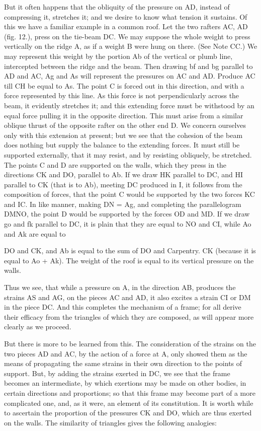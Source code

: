 \documentclass{article}
\begin{document}
But it often happens that the obliquity of the pressure on AD, instead of compressing it, stretches it; and we desire to know what tension it sustains. Of this we have a familiar example in a common roof. Let the two rafters AC, AD (fig. 12.), press on the tie-beam DC. We may suppose the whole weight to press vertically on the ridge A, as if a weight B were hung on there. (See Note CC.) We may represent this weight by the portion Ab of the vertical or plumb line, intercepted between the ridge and the beam. Then drawing bf and bg parallel to AD and AC, Ag and As will represent the pressures on AC and AD. Produce AC till CH be equal to As. The point C is forced out in this direction, and with a force represented by this line. As this force is not perpendicularly across the beam, it evidently stretches it; and this extending force must be withstood by an equal force pulling it in the opposite direction. This must arise from a similar oblique thrust of the opposite rafter on the other end D. We concern ourselves only with this extension at present; but we see that the cohesion of the beam does nothing but supply the balance to the extending forces. It must still be supported externally, that it may resist, and by resisting obliquely, be stretched. The points C and D are supported on the walls, which they press in the directions CK and DO, parallel to Ab. If we draw HK parallel to DC, and HI parallel to CK (that is to Ab), meeting DC produced in I, it follows from the composition of forces, that the point C would be supported by the two forces KC and IC. In like manner, making DN = Ag, and completing the parallelogram DMNO, the point D would be supported by the forces OD and MD. If we draw go and fk parallel to DC, it is plain that they are equal to NO and CI, while Ao and Ak are equal to

DO and CK, and Ab is equal to the sum of DO and Carpentry. CK (because it is equal to Ao + Ak). The weight of the roof is equal to its vertical pressure on the walls.

Thus we see, that while a pressure on A, in the direction AB, produces the strains AS and AG, on the pieces AC and AD, it also excites a strain CI or DM in the piece DC. And this completes the mechanism of a frame; for all derive their efficacy from the triangles of which they are composed, as will appear more clearly as we proceed.

But there is more to be learned from this. The consideration of the strains on the two pieces AD and AC, by the action of a force at A, only showed them as the means of propagating the same strains in their own direction to the points of support. But, by adding the strains exerted in DC, we see that the frame becomes an intermediate, by which exertions may be made on other bodies, in certain directions and proportions; so that this frame may become part of a more complicated one, and, as it were, an element of its constitution. It is worth while to ascertain the proportion of the pressures CK and DO, which are thus exerted on the walls. The similarity of triangles gives the following analogies:
\end{document}
